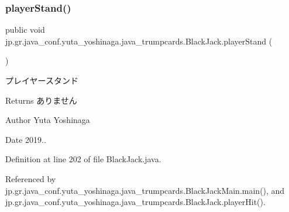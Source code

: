 \subsubsection{\texorpdfstring{player\+Stand()}{playerStand()}}
{\footnotesize\ttfamily public void jp.\+gr.\+java\+\_\+conf.\+yuta\+\_\+yoshinaga.\+java\+\_\+trumpcards.\+Black\+Jack.\+player\+Stand (\begin{DoxyParamCaption}{ }\end{DoxyParamCaption})}



プレイヤースタンド 

\begin{DoxyReturn}{Returns}
ありません 
\end{DoxyReturn}
\begin{DoxyAuthor}{Author}
Yuta Yoshinaga 
\end{DoxyAuthor}
\begin{DoxyDate}{Date}
2019.. 
\end{DoxyDate}


Definition at line 202 of file Black\+Jack.\+java.



Referenced by jp.\+gr.\+java\+\_\+conf.\+yuta\+\_\+yoshinaga.\+java\+\_\+trumpcards.\+Black\+Jack\+Main.\+main(), and jp.\+gr.\+java\+\_\+conf.\+yuta\+\_\+yoshinaga.\+java\+\_\+trumpcards.\+Black\+Jack.\+player\+Hit().

